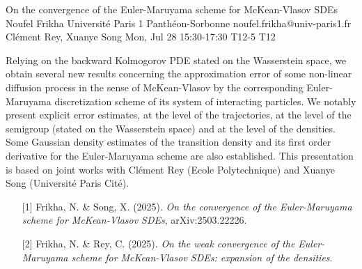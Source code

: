 \begin{talk}
  {On the convergence of the Euler-Maruyama scheme for McKean-Vlasov SDEs}%
  {Noufel Frikha}%
  {Universit\'e Paris 1 Panth\'eon-Sorbonne}%
  {noufel.frikha@univ-paris1.fr}%
  {Cl\'ement Rey, Xuanye Song}%
  {}%
  {Mon, Jul 28 15:30-17:30}%
  {T12-5}%
  {T12}%
  
				
			
Relying on the backward Kolmogorov PDE stated on the Wasserstein space, we obtain several new results concerning the approximation error of some non-linear diffusion process in the sense of McKean-Vlasov by the corresponding Euler-Maruyama discretization scheme of its system of interacting particles. We notably present explicit error estimates, at the level of the trajectories, at the level of the semigroup (stated on the Wasserstein space) and at the level of the densities. Some Gaussian density estimates of the transition density and its first order derivative for the Euler-Maruyama scheme are also established. This presentation is based on joint works with Cl\'ement Rey (Ecole Polytechnique) and Xuanye Song (Universit\'e Paris Cit\'e).

\medskip


\begin{enumerate}
	\item[{[1]}] Frikha, N.  \& Song, X. (2025). {\it On the convergence of the Euler-Maruyama scheme for McKean-Vlasov SDEs}, arXiv:2503.22226.
	\item[{[2]}] Frikha, N. \& Rey, C. (2025).  {\it On the weak convergence of the Euler-Maruyama scheme for McKean-Vlasov SDEs: expansion of the densities}.
\end{enumerate}


\end{talk}

